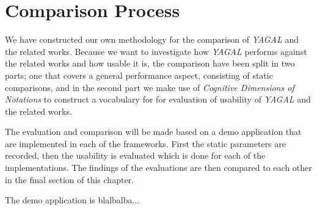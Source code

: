 \section{Comparison Process}
We have constructed our own methodology for the comparison of \textit{YAGAL} and the related works. Because we want to investigate how \textit{YAGAL} performs against the related works and how usable it is, the comparison have been split in two parts; one that covers a general performance aspect, consisting of static comparisons, and in the second part we make use of \textit{Cognitive Dimensions of Notations} to construct a vocabulary for for evaluation of usability of \textit{YAGAL} and the related works.

The evaluation and comparison will be made based on a demo application that are implemented in each of the frameworks. First the static parameters are recorded, then the usability is evaluated which is done for each of the implementations. The findings of the evaluations are then compared to each other in the final section of this chapter.

The demo application is blalbalba...
